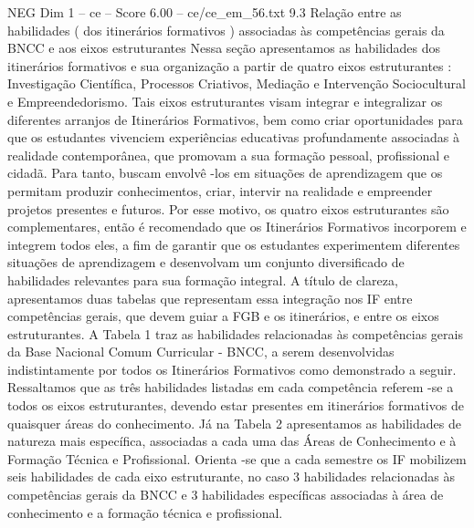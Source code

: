 \begin{textsample}{NEG Dim 1 – ce – Score 6.00 – ce/ce\_em\_56.txt}  \label{ex:f1_neg_246}
9.3 Relação entre as habilidades ( dos itinerários formativos ) associadas às competências gerais da BNCC e aos eixos estruturantes Nessa seção apresentamos as habilidades dos itinerários formativos e sua organização a partir de quatro eixos estruturantes : Investigação Científica, Processos Criativos, Mediação e Intervenção Sociocultural e Empreendedorismo.
Tais eixos estruturantes visam integrar e integralizar os diferentes arranjos de Itinerários Formativos, bem como criar oportunidades para que os estudantes vivenciem experiências educativas profundamente associadas à realidade contemporânea, que promovam a sua formação pessoal, profissional e cidadã.
Para tanto, buscam envolvê -los em situações de aprendizagem que os permitam produzir conhecimentos, criar, intervir na realidade e empreender projetos presentes e futuros.
Por esse motivo, os quatro eixos estruturantes são complementares, então é recomendado que os Itinerários Formativos incorporem e integrem todos eles, a fim de garantir que os estudantes experimentem diferentes situações de aprendizagem e desenvolvam um conjunto diversificado de habilidades relevantes para sua formação integral.
A título de clareza, apresentamos duas tabelas que representam essa integração nos IF entre competências gerais, que devem guiar a FGB e os itinerários, e entre os eixos estruturantes.
A Tabela 1 traz as habilidades relacionadas às competências gerais da Base Nacional Comum Curricular - BNCC, a serem desenvolvidas indistintamente por todos os Itinerários Formativos como demonstrado a seguir.
Ressaltamos que as três habilidades listadas em cada competência referem -se a todos os eixos estruturantes, devendo estar presentes em itinerários formativos de quaisquer áreas do conhecimento.
Já na Tabela 2 apresentamos as habilidades de natureza mais específica, associadas a cada uma das Áreas de Conhecimento e à Formação Técnica e Profissional.
Orienta -se que a cada semestre os IF mobilizem seis habilidades de cada eixo estruturante, no caso 3 habilidades relacionadas às competências gerais da BNCC e 3 habilidades específicas associadas à área de conhecimento e a formação técnica e profissional.

\end{textsample}
